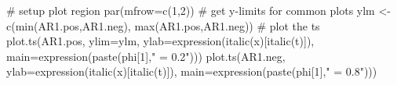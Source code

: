 \begin{Schunk}
\begin{Sinput}
 # setup plot region
 par(mfrow=c(1,2))
 # get y-limits for common plots
 ylm <- c(min(AR1.pos,AR1.neg), max(AR1.pos,AR1.neg))
 # plot the ts
 plot.ts(AR1.pos, ylim=ylm,
         ylab=expression(italic(x)[italic(t)]),
         main=expression(paste(phi[1]," = 0.2")))
 plot.ts(AR1.neg,
         ylab=expression(italic(x)[italic(t)]),
         main=expression(paste(phi[1]," = 0.8")))
\end{Sinput}
\end{Schunk}
